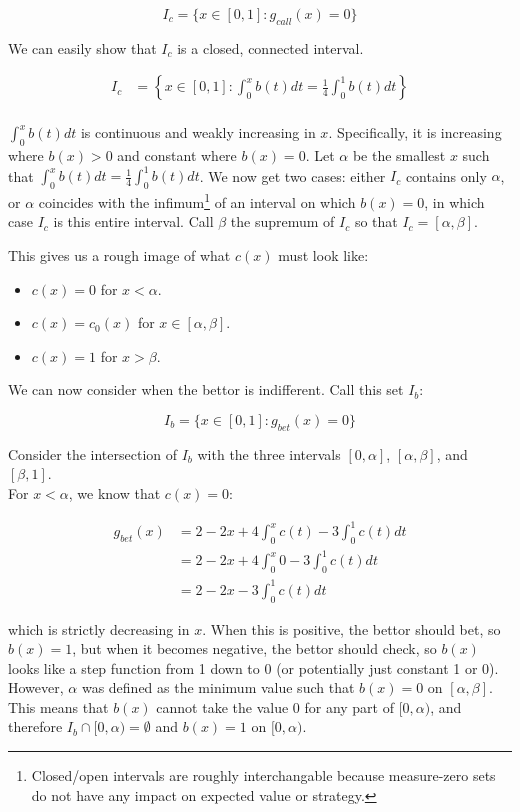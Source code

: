\documentclass[a4paper,12pt]{article}
\begin{document}
\[ I_c = \{ x \in [0, 1] : g_{call}(x) = 0 \} \]

We can easily show that $I_c$ is a closed, connected interval.

\begin{align*}
    I_c &= \left\{ x \in [0, 1] : \int_{0}^{x} b(t) dt = \frac{1}{4} \int_{0}^{1} b(t)dt \right\} \\
\end{align*}

$\int_{0}^{x} b(t) dt$ is continuous and weakly increasing in $x$. Specifically, it is increasing where $b(x) > 0$ and constant where $b(x) = 0$. Let $\alpha$ be the smallest $x$ such that $\int_{0}^{x} b(t) dt = \frac{1}{4} \int_{0}^{1} b(t)dt$. We now get two cases: either $I_c$ contains only $\alpha$, or $\alpha$ coincides with the infimum\footnote{Closed/open intervals are roughly interchangable because measure-zero sets do not have any impact on expected value or strategy.} of an interval on which $b(x)=0$, in which case $I_c$ is this entire interval. Call $\beta$ the supremum of $I_c$ so that $I_c = [\alpha, \beta]$.

This gives us a rough image of what $c(x)$ must look like: 

\begin{itemize}
    \item $c(x) = 0$ for $x < \alpha$.
    \item $c(x) = c_0(x)$ for $x \in [\alpha, \beta]$.
    \item $c(x) = 1$ for $x > \beta$.
\end{itemize}

We can now consider when the bettor is indifferent. Call this set $I_b$:

\[ I_b = \{ x \in [0, 1] : g_{bet}(x) = 0 \} \]

Consider the intersection of $I_b$ with the three intervals $[0, \alpha]$, $[\alpha, \beta]$, and $[\beta, 1]$.\\

For $x < \alpha$, we know that $c(x) = 0$:

\begin{align*}
    g_{bet}(x) &= 2 - 2x + 4 \int_{0}^{x} c(t) - 3 \int_{0}^{1} c(t) dt \\
    &= 2 - 2x + 4 \int_{0}^{x} 0 - 3 \int_{0}^{1} c(t) dt \\
    &= 2 - 2x - 3 \int_{0}^{1} c(t) dt
\end{align*}

which is strictly decreasing in $x$. When this is positive, the bettor should bet, so $b(x)=1$, but when it becomes negative, the bettor should check, so $b(x)$ looks like a step function from 1 down to 0 (or potentially just constant 1 or 0). However, $\alpha$ was defined as the minimum value such that $b(x)=0$ on $[\alpha, \beta]$. This means that $b(x)$ cannot take the value 0 for any part of $[0, \alpha)$, and therefore $I_b \cap [0, \alpha) = \emptyset$ and $b(x) = 1$ on $[0, \alpha)$.\\ 
\end{document}
